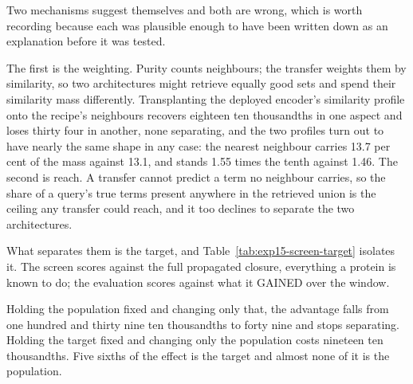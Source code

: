 \begin{table}[htbp]
  \centering
  \caption{Neighbour purity and maximum F-measure against the deployed encoder, in the
  served no-knowledge cell of 649 proteins, at ten neighbours. Purity is measured on
  proteins of other categories, so no arm is scored on what it was fitted on. Intervals
  are a paired bootstrap with the measure recomputed inside every resample.}
  \label{tab:exp15-screen-vs-task}
  
\end{table}

Two mechanisms suggest themselves and both are wrong, which is worth recording because
each was plausible enough to have been written down as an explanation before it was
tested.

The first is the weighting. Purity counts neighbours; the transfer weights them by
similarity, so two architectures might retrieve equally good sets and spend their
similarity mass differently. Transplanting the deployed encoder's similarity profile onto
the recipe's neighbours recovers eighteen ten thousandths in one aspect and loses
thirty four in another, none separating, and the two profiles turn out to have nearly the
same shape in any case: the nearest neighbour carries 13.7 per cent of the mass against
13.1, and stands 1.55 times the tenth against 1.46. The second is reach. A transfer
cannot predict a term no neighbour carries, so the share of a query's true terms present
anywhere in the retrieved union is the ceiling any transfer could reach, and it too
declines to separate the two architectures.

What separates them is the target, and Table~\ref{tab:exp15-screen-target} isolates it.
The screen scores against the full propagated closure, everything a protein is known to
do; the evaluation scores against what it GAINED over the window.

\begin{table}[htbp]
  \centering
  \caption{Neighbour purity of the recipe against the deployed encoder, with the
  population and the target varied one at a time. $^{\dagger}$~does not separate.}
  \label{tab:exp15-screen-target}
  
\end{table}
 Holding the population fixed and changing only that, the advantage falls from
one hundred and thirty nine ten thousandths to forty nine and stops separating. Holding
the target fixed and changing only the population costs nineteen ten thousandths. Five
sixths of the effect is the target and almost none of it is the population.

